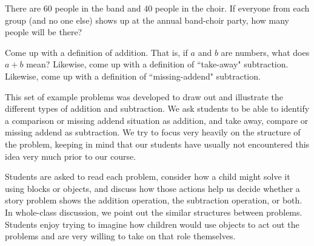 \documentclass{ximera}
\begin{document}
\begin{problem}
There are 60 people in the band and 40 people in the choir.  If everyone from each group (and no one else) shows up at the annual band-choir party, how many people will be there?
\end{problem}

\begin{problem} \label{AddingUpSummary}
 Come up with a definition of addition.  That is, if $a$ and $b$ are numbers, what does $a + b$ mean?  Likewise, come up with a definition of ``take-away" subtraction.  Likewise, come up with a definition of ``missing-addend" subtraction.  
\end{problem}


\newpage
\begin{instructorNotes}
This set of example problems was developed to draw out and illustrate the different types of addition and subtraction.  We ask students to be able to identify a comparison or missing addend situation as addition, and take away, compare or missing addend as subtraction.  We try to focus very heavily on the structure of the problem, keeping in mind that our students have usually not encountered this idea very much prior to our course.

Students are asked to read each problem, consider how a child might solve it using blocks or objects, and discuss how those actions help us decide whether a story problem shows the addition operation, the subtraction operation, or both.  In whole-class discussion, we point out the similar structures between problems. Students enjoy trying to imagine how children would use objects to act out the problems and are very willing to take on that role themselves.



\end{instructorNotes}
\end{document}
